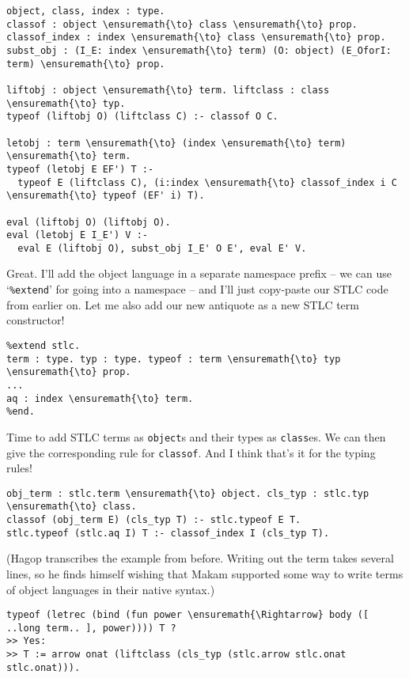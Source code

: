 \begin{verbatim}
object, class, index : type.
classof : object \ensuremath{\to} class \ensuremath{\to} prop.
classof_index : index \ensuremath{\to} class \ensuremath{\to} prop.
subst_obj : (I_E: index \ensuremath{\to} term) (O: object) (E_OforI: term) \ensuremath{\to} prop.

liftobj : object \ensuremath{\to} term. liftclass : class \ensuremath{\to} typ.
typeof (liftobj O) (liftclass C) :- classof O C.

letobj : term \ensuremath{\to} (index \ensuremath{\to} term) \ensuremath{\to} term.
typeof (letobj E EF') T :-
  typeof E (liftclass C), (i:index \ensuremath{\to} classof_index i C \ensuremath{\to} typeof (EF' i) T).

eval (liftobj O) (liftobj O).
eval (letobj E I_E') V :-
  eval E (liftobj O), subst_obj I_E' O E', eval E' V.
\end{verbatim}

\heroADVISOR{} Great. I'll add the object language in a separate namespace
prefix -- we can use `\texttt{\%extend}' for going into a namespace --
and I'll just copy-paste our STLC code from earlier on. Let me also add
our new antiquote as a new STLC term constructor!

\begin{verbatim}
%extend stlc.
term : type. typ : type. typeof : term \ensuremath{\to} typ \ensuremath{\to} prop.
...
aq : index \ensuremath{\to} term.
%end.
\end{verbatim}

\heroSTUDENT{} Time to add STLC terms as \texttt{object}s and their types as
\texttt{class}es. We can then give the corresponding rule for
\texttt{classof}. And I think that's it for the typing rules!

\begin{verbatim}
obj_term : stlc.term \ensuremath{\to} object. cls_typ : stlc.typ \ensuremath{\to} class.
classof (obj_term E) (cls_typ T) :- stlc.typeof E T.
stlc.typeof (stlc.aq I) T :- classof_index I (cls_typ T).
\end{verbatim}

\begin{scenecomment}
(Hagop transcribes the example from before. Writing out the term takes several lines, so he finds himself
wishing that Makam supported some way to write terms of object languages in their native syntax.)
\end{scenecomment}

\begin{verbatim}
typeof (letrec (bind (fun power \ensuremath{\Rightarrow} body ([ ..long term.. ], power)))) T ?
>> Yes:
>> T := arrow onat (liftclass (cls_typ (stlc.arrow stlc.onat stlc.onat))).
\end{verbatim}

